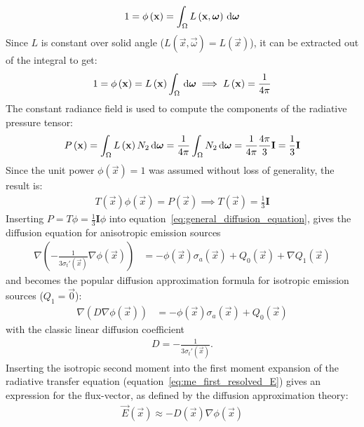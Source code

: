 \begin{align*}
1 = \phi\left(\boldsymbol{\mathbf{x}}\right) = \int_\Omega{L\left(\boldsymbol{\mathbf{x}}, \boldsymbol{\mathbf{\omega}}\right)\,\mathrm{d}\boldsymbol{\mathbf{\omega}}}
\end{align*}
Since $L$ is constant over solid angle ($L(\vec{x}, \vec{\omega})=L(\vec{x})$), it can be extracted out of the integral to get:
\begin{align*}
1 = \phi\left(\boldsymbol{\mathbf{x}}\right) = L\left(\boldsymbol{\mathbf{x}}\right)\int_\Omega{\,\mathrm{d}\boldsymbol{\mathbf{\omega}}}\implies L\left(\boldsymbol{\mathbf{x}}\right) = \frac{1}{4\pi}
\end{align*}
The constant radiance field is used to compute the components of the radiative pressure tensor:
\begin{align*}
P\left(\boldsymbol{\mathbf{x}}\right) 
= \int_\Omega{L\left(\boldsymbol{\mathbf{x}}\right)N_2\,\mathrm{d}\boldsymbol{\mathbf{\omega}}}
= \frac{1}{4\pi}\int_\Omega{N_2\,\mathrm{d}\boldsymbol{\mathbf{\omega}}}
= \frac{1}{4\pi}\frac{4\pi}{3}\mathbf{I}
= \frac{1}{3}\mathbf{I}
\end{align*}
Since the unit power $\phi(\vec{x})=1$ was assumed without loss of generality, the result is:
\begin{align*}
T(\vec{x})\phi(\vec{x}) = P(\vec{x}) \implies T(\vec{x})=\frac{1}{3}\mathbf{I}
\end{align*}
Inserting $P=T\phi=\frac{1}{3}\mathbf{I}\phi$ into equation~\ref{eq:general_diffusion_equation}, gives the diffusion equation for anisotropic emission sources
\begin{align}
\label{eq:diffusion_equation_anisotropic_Q}
\nabla
\left(
-\frac{1}{3\sigma_t'\left(\vec{x}\right)}
\nabla \phi\left(\vec{x}\right)
\right)&=
-\phi(\vec{x})\sigma_a(\vec{x})
+Q_0\left(\vec{x}\right)
+\nabla Q_1\left(\vec{x}\right)
\end{align}
and becomes the popular diffusion approximation formula for isotropic emission sources ($Q_1=\vec{0}$):
\begin{align}
\label{eq:diffusion_equation_anisotropic_Q}
\nabla
\left(
D
\nabla \phi\left(\vec{x}\right)
\right)&=
-\phi(\vec{x})\sigma_a(\vec{x})
+Q_0\left(\vec{x}\right)
\end{align}
with the classic linear diffusion coefficient
\begin{align}
D=-\frac{1}{3\sigma_t'\left(\vec{x}\right)}
.
\label{eq:da_D}
\end{align}
Inserting the isotropic second moment into the first moment expansion of the radiative transfer equation (equation~\ref{eq:me_first_resolved_E}) gives an expression for the flux-vector, as defined by the diffusion approximation theory:
\begin{align}
\label{eq:diffusion_ficks_law}
\vec{E}\left(\vec{x}\right) \approx -D\left(\vec{x}\right)\nabla\phi\left(\vec{x}\right)
\end{align}
